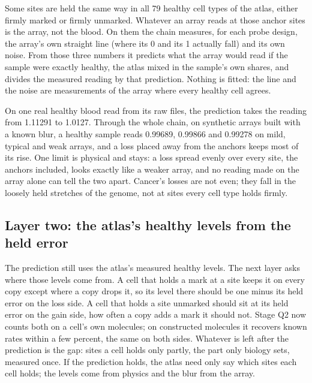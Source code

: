 Some sites are held the same way in all 79 healthy cell types of the atlas, either firmly marked or firmly unmarked. Whatever an array
reads at those anchor sites is the array, not the blood. On them the chain measures, for each probe design, the array's own straight line
(where its 0 and its 1 actually fall) and its own noise. From those three numbers it predicts what the array would read if the sample
were exactly healthy, the atlas mixed in the sample's own shares, and divides the measured reading by that prediction. Nothing is fitted:
the line and the noise are measurements of the array where every healthy cell agrees.

On one real healthy blood read from its raw files, the prediction takes the reading from 1.11291 to 1.0127. Through the whole chain, on
synthetic arrays built with a known blur, a healthy sample reads 0.99689, 0.99866 and 0.99278 on mild, typical and weak arrays, and a loss
placed away from the anchors keeps most of its rise. One limit is physical and stays: a loss spread evenly over every site, the anchors
included, looks exactly like a weaker array, and no reading made on the array alone can tell the two apart. Cancer's losses are not even;
they fall in the loosely held stretches of the genome, not at sites every cell type holds firmly.

\subsection{Layer two: the atlas's healthy levels from the held error}

The prediction still uses the atlas's measured healthy levels. The next layer asks where those levels come from. A cell that holds a mark
at a site keeps it on every copy except where a copy drops it, so its level there should be one minus its held error on the loss side. A
cell that holds a site unmarked should sit at its held error on the gain side, how often a copy adds a mark it should not. Stage Q2 now
counts both on a cell's own molecules; on constructed molecules it recovers known rates within a few percent, the same on both sides.
Whatever is left after the prediction is the gap: sites a cell holds only partly, the part only biology sets, measured once. If the
prediction holds, the atlas need only say which sites each cell holds; the levels come from physics and the blur from the array.

